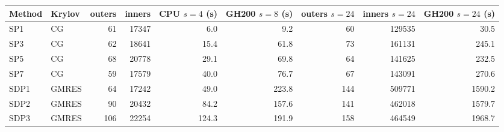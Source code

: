 \begin{tabular}{llrrrrrrr}
\hline
Method & Krylov & outers & inners & CPU $s=4$ (s) & GH200 $s=8$ (s) & outers $s=24$ & inners $s=24$ & GH200 $s=24$ (s) \\
\hline
SP1 & CG & 61 & 17347 & 6.0 & 9.2 & 60 & 129535 & 30.5 \\
SP3 & CG & 62 & 18641 & 15.4 & 61.8 & 73 & 161131 & 245.1 \\
SP5 & CG & 68 & 20778 & 29.1 & 69.8 & 64 & 141625 & 232.5 \\
SP7 & CG & 59 & 17579 & 40.0 & 76.7 & 67 & 143091 & 270.6 \\
SDP1 & GMRES & 64 & 17242 & 49.0 & 223.8 & 144 & 509771 & 1590.2 \\
SDP2 & GMRES & 90 & 20432 & 84.2 & 157.6 & 141 & 462018 & 1579.7 \\
SDP3 & GMRES & 106 & 22254 & 124.3 & 191.9 & 158 & 464549 & 1968.7 \\
\hline
\end{tabular}

